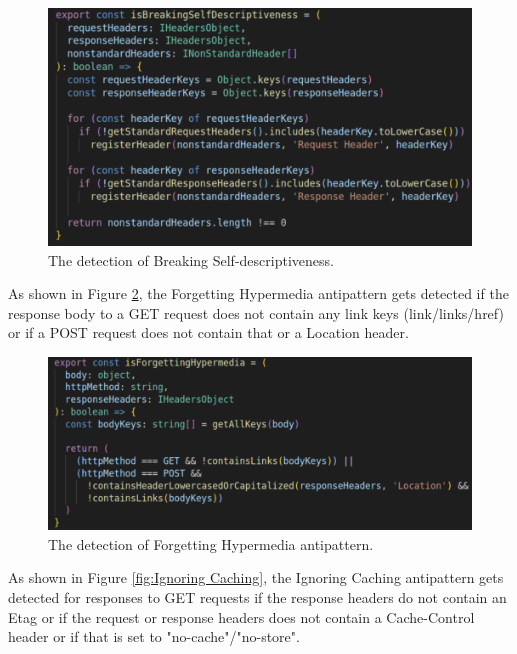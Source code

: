 \documentclass[a4paper,12pt]{article}
\begin{document}
\begin{figure}[h!]
    \centering
    \includegraphics[keepaspectratio,scale=0.8]{Template_report_LaTeX_EN/img/breakingSelfDescriptiveness.png}
    \caption{The detection of Breaking Self-descriptiveness.}
    \label{fig:Breaking Self-descriptiveness}
\end{figure}

As shown in Figure \ref{fig:Forgetting Hypermedia}, the Forgetting Hypermedia antipattern gets detected if the response body to a GET request does not contain any link keys (link/links/href) or if a POST request does not contain that or a Location header.

\begin{figure}[h!]
    \centering
    \includegraphics[keepaspectratio,scale=0.8]{Template_report_LaTeX_EN/img/forgettingHyperMedia.png}
    \caption{The detection of Forgetting Hypermedia antipattern.}
    \label{fig:Forgetting Hypermedia}
\end{figure}

As shown in Figure \ref{fig:Ignoring Caching}, the Ignoring Caching antipattern gets detected for responses to GET requests if the response headers do not contain an Etag or if the request or response headers does not contain a Cache-Control header or if that is set to "no-cache"/"no-store".
\end{document}
